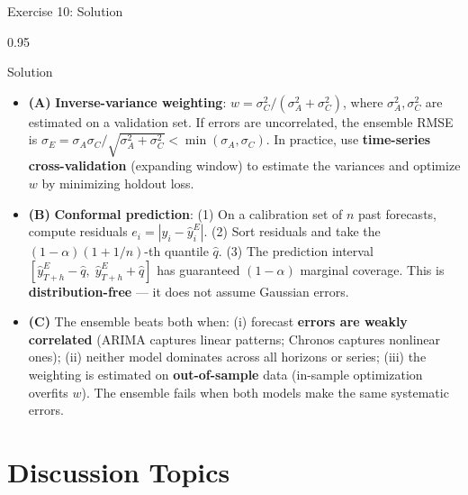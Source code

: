 \documentclass[9pt, aspectratio=169, t]{beamer}
\begin{document}
\begin{frame}{Exercise 10: Solution}
    \begin{cminipage}{0.95\textwidth}
    \begin{exampleblock}{Solution}
        {\footnotesize
        \begin{itemize}\setlength{\itemsep}{3pt}
            \item \textcolor{MainBlue}{\textbf{(A)}} \textbf{Inverse-variance weighting}: $w = \sigma_C^2 / (\sigma_A^2 + \sigma_C^2)$, where $\sigma_A^2, \sigma_C^2$ are estimated on a validation set. If errors are uncorrelated, the ensemble RMSE is $\sigma_E = \sigma_A \sigma_C / \sqrt{\sigma_A^2 + \sigma_C^2} < \min(\sigma_A, \sigma_C)$. In practice, use \textbf{time-series cross-validation} (expanding window) to estimate the variances and optimize $w$ by minimizing holdout loss.
            \item \textcolor{MainBlue}{\textbf{(B)}} \textbf{Conformal prediction}: (1) On a calibration set of $n$ past forecasts, compute residuals $e_i = |y_i - \hat{y}^{E}_i|$. (2) Sort residuals and take the $(1-\alpha)(1 + 1/n)$-th quantile $\hat{q}$. (3) The prediction interval $[\hat{y}^{E}_{T+h} - \hat{q},\; \hat{y}^{E}_{T+h} + \hat{q}]$ has guaranteed $(1-\alpha)$ marginal coverage. This is \textbf{distribution-free} --- it does not assume Gaussian errors.
            \item \textcolor{MainBlue}{\textbf{(C)}} The ensemble beats both when: (i) forecast \textbf{errors are weakly correlated} (ARIMA captures linear patterns; Chronos captures nonlinear ones); (ii) neither model dominates across all horizons or series; (iii) the weighting is estimated on \textbf{out-of-sample} data (in-sample optimization overfits $w$). The ensemble fails when both models make the same systematic errors.
        \end{itemize}
        }
    \end{exampleblock}
    \end{cminipage}
\end{frame}

\section{Discussion Topics}
\end{document}
